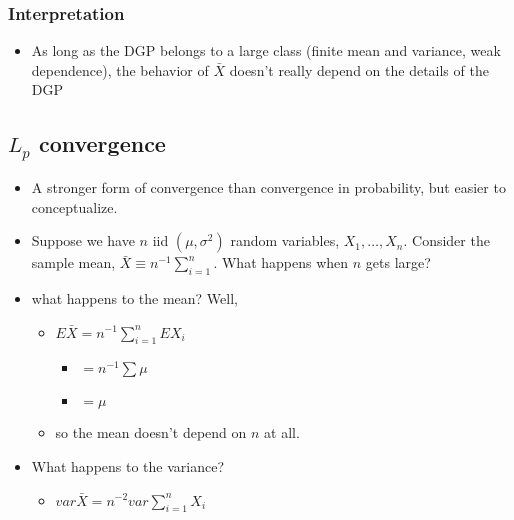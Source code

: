 \documentclass[11pt]{article}
\begin{document}
\subsubsection{Interpretation}
\label{sec-1-1-4}

\begin{itemize}
\item As long as the DGP belongs to a large class (finite mean and
        variance, weak dependence), the behavior of $\bar X$ doesn't
        really depend on the details of the DGP
\end{itemize}
\subsection{$L_p$ convergence}
\label{sec-1-2}

\begin{itemize}
\item A stronger form of convergence than convergence in probability,
        but easier to conceptualize.
\item Suppose we have $n$ iid $(\mu, \sigma^2)$ random variables,
        $X_1,\dots,X_n$.  Consider the sample mean, $\bar X \equiv
        n^{-1} \sum_{i=1}^n$.  What happens when $n$ gets large?
\item what happens to the mean?  Well,
\begin{itemize}
\item $E \bar X = n^{-1} \sum_{i=1}^n E X_i$
\begin{itemize}
\item $= n^{-1} \sum \mu$
\item $= \mu$
\end{itemize}
\item so the mean doesn't depend on $n$ at all.
\end{itemize}
\item What happens to the variance?
\begin{itemize}
\item $var \bar X = n^{-2} var \sum_{i=1}^n X_i$
\end{itemize}
\end{itemize}
\end{document}

